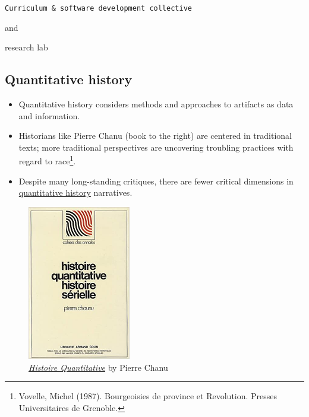 \documentclass[
  letterpaper,
  DIV=11,
  numbers=noendperiod]{scrartcl}
\begin{document}
\texttt{Curriculum\ \&\ software\ development\ collective}

and

{research lab}

\hypertarget{quantitative-history}{%
\subsection{Quantitative history}\label{quantitative-history}}

\begin{itemize}
\item
  Quantitative history considers methods and approaches to artifacts as
  data and information.
\item
  Historians like Pierre Chanu (book to the right) are centered in
  traditional texts; more traditional perspectives are uncovering
  troubling practices with regard to race\footnote{Vovelle, Michel
    (1987). Bourgeoisies de province et Revolution. Presses
    Universitaires de Grenoble.}.
\item
  Despite many long-standing critiques, there are {fewer critical
  dimensions} in \protect\hyperlink{quantitative-history}{quantitative
  history} narratives.
\end{itemize}

\begin{figure}

{\centering \includegraphics[width=0.4\textwidth,height=\textheight]{quanthist.jpg}

}

\caption{\href{https://www.jstor.org/stable/1876930}{\emph{Histoire
Quantitative}} by Pierre Chanu}

\end{figure}
\end{document}
